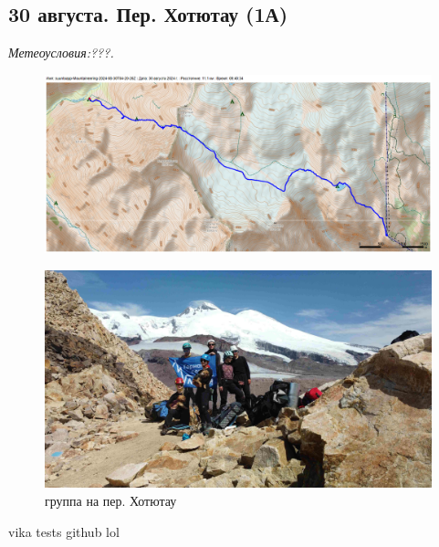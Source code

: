 \subsection{30 августа. Пер. Хотютау (1А)}
\textit{Метеоусловия:???.}

\begin{figure}[h!]
	\centering
	\includegraphics[angle=0, width=0.3\linewidth]{../pics/mini_maps/30}
	\label{fig:mini_30}
\end{figure}




\begin{figure}[h!]
	\centering
	\includegraphics[width=0.7\linewidth]{../pics/DJI_0899}
	\caption{группа на пер. Хотютау}
	\label{fig:hotyutau_1}
\end{figure}

vika tests github lol 
\newpage